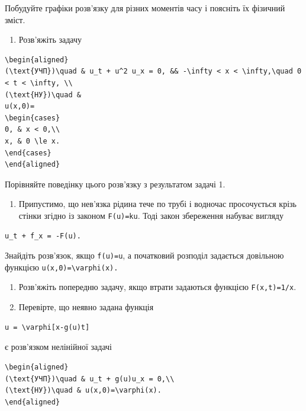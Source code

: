 \documentclass[
  ukrainian,
]{article}
\providecommand{\tightlist}{%
  \setlength{\itemsep}{0pt}\setlength{\parskip}{0pt}}
\begin{document}
Побудуйте графіки розв'язку для різних моментів часу і поясніть їх
фізичний зміст.

\begin{enumerate}
\def\labelenumi{\arabic{enumi}.}
\setcounter{enumi}{1}
\tightlist
\item
  Розв'яжіть задачу
\end{enumerate}

\begin{verbatim}
\begin{aligned}
(\text{УЧП})\quad & u_t + u^2 u_x = 0, && -\infty < x < \infty,\quad 0 < t < \infty, \\
(\text{НУ})\quad &
u(x,0)=
\begin{cases}
0, & x < 0,\\
x, & 0 \le x.
\end{cases}
\end{aligned}
\end{verbatim}

Порівняйте поведінку цього розв'язку з результатом задачі 1.

\begin{enumerate}
\def\labelenumi{\arabic{enumi}.}
\setcounter{enumi}{2}
\tightlist
\item
  Припустимо, що нев'язка рідина тече по трубі і водночас просочується
  крізь стінки згідно із законом \texttt{F(u)=ku}. Тоді закон збереження
  набуває вигляду
\end{enumerate}

\begin{verbatim}
u_t + f_x = -F(u).
\end{verbatim}

Знайдіть розв'язок, якщо \texttt{f(u)=u}, а початковий розподіл
задається довільною функцією
\texttt{\textquotesingle{}u(x,0)=\textbackslash{}varphi(x)\textquotesingle{}.}

\begin{enumerate}
\def\labelenumi{\arabic{enumi}.}
\setcounter{enumi}{3}
\item
  Розв'яжіть попередню задачу, якщо втрати задаються функцією
  \texttt{F(x,t)=1/x}.
\item
  Перевірте, що неявно задана функція
\end{enumerate}

\begin{verbatim}
u = \varphi[x-g(u)t]
\end{verbatim}

є розв'язком нелінійної задачі

\begin{verbatim}
\begin{aligned}
(\text{УЧП})\quad & u_t + g(u)u_x = 0,\\
(\text{НУ})\quad & u(x,0)=\varphi(x).
\end{aligned}
\end{verbatim}
\end{document}
